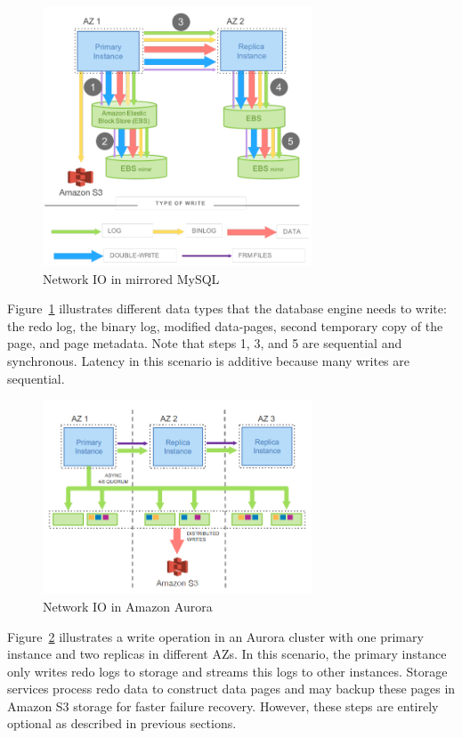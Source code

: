\documentclass[conference]{IEEEtran}
\begin{document}
\begin{figure}[!htb]
    \centering
    \includegraphics[width=8cm]{../images/sql_networkio.png}
    \caption{Network IO in mirrored MySQL}
    \label{sql_io}
\end{figure}

Figure~\ref{sql_io} illustrates different data types that the database engine needs to write: the redo log, the binary log, modified data-pages, second temporary copy of the page, and page metadata. Note that steps 1, 3, and 5 are sequential and synchronous. Latency in this scenario is additive because many writes are sequential.

\begin{figure}[!htb]
    \centering
    \includegraphics[width=8cm]{../images/aurora_networkio.png}
    \caption{Network IO in Amazon Aurora}
    \label{aurora_io}
\end{figure}

Figure~\ref{aurora_io} illustrates a write operation in an Aurora cluster with one primary instance and two replicas in different AZs. In this scenario, the primary instance only writes redo logs to storage and streams this logs to other instances. Storage services process redo data to construct data pages and may backup these pages in Amazon S3 storage for faster failure recovery. However, these steps are entirely optional as described in previous sections. 
\end{document}
